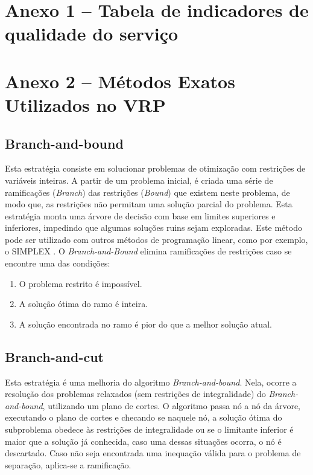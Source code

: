 \section*{Anexo 1 -- Tabela de indicadores de qualidade do serviço}

\section*{Anexo 2 -- Métodos Exatos Utilizados no VRP }
\subsection*{Branch-and-bound}
Esta estratégia consiste em solucionar problemas de otimização com restrições de variáveis inteiras. A partir de um problema inicial, é criada uma série de ramificações (\emph{Branch}) das restrições (\emph{Bound}) que existem neste problema, de modo que, as restrições não permitam uma solução parcial do problema. Esta estratégia monta uma árvore de decisão com base em limites superiores e inferiores, impedindo que algumas soluções ruins sejam exploradas. Este método pode ser utilizado com outros métodos de programação linear, como por exemplo, o SIMPLEX \cite{LAPORTE1992345}. O \emph{Branch-and-Bound} elimina ramificações de restrições caso se encontre uma das condições:

\begin{enumerate}
    \item O problema restrito é impossível.
    \item A solução ótima do ramo é inteira.
    \item A solução encontrada no ramo é pior do que a melhor solução atual.
\end{enumerate}

\subsection*{Branch-and-cut}
Esta estratégia é uma melhoria do algoritmo \emph{Branch-and-bound}. Nela, ocorre a resolução dos problemas relaxados (sem restrições de integralidade) do \emph{Branch-and-bound}, utilizando um plano de cortes. O algoritmo passa nó a nó da árvore, executando o plano de cortes e checando se naquele nó, a solução ótima do subproblema obedece às restrições de integralidade ou se o limitante inferior é maior que a solução já conhecida, caso uma dessas situações ocorra, o nó é descartado. Caso não seja encontrada uma inequação válida para o problema de separação, aplica-se a ramificação.

